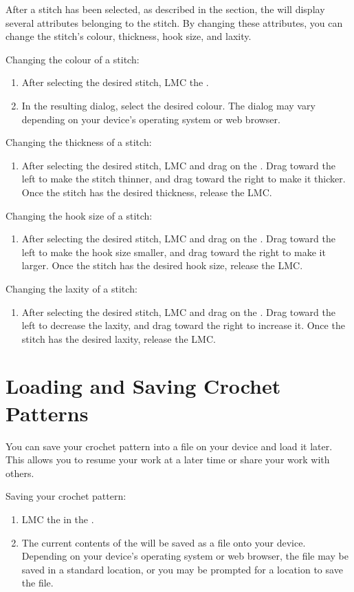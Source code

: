 \documentclass[main.tex]{subfiles}
\begin{document}
After a stitch has been selected, as described in the  section, the \PropSidebar{} will display several attributes belonging to the stitch. By changing these attributes, you can change the stitch's colour, thickness, hook size, and laxity.

Changing the colour of a stitch:
\begin{enumerate}
\item After selecting the desired stitch, LMC the \YCP.
\item In the resulting dialog, select the desired colour. The dialog may vary depending on your device's operating system or web browser.
\end{enumerate}

Changing the thickness of a stitch:
\begin{enumerate}
\item After selecting the desired stitch, LMC and drag on the \YTS. Drag toward the left to make the stitch thinner, and drag toward the right to make it thicker. Once the stitch has the desired thickness, release the LMC.
\end{enumerate}

Changing the hook size of a stitch:
\begin{enumerate}
\item After selecting the desired stitch, LMC and drag on the \HSS. Drag toward the left to make the hook size smaller, and drag toward the right to make it larger. Once the stitch has the desired hook size, release the LMC.
\end{enumerate}

Changing the laxity of a stitch:
\begin{enumerate}
\item After selecting the desired stitch, LMC and drag on the \SLS. Drag toward the left to decrease the laxity, and drag toward the right to increase it. Once the stitch has the desired laxity, release the LMC.
\end{enumerate}

\section{Loading and Saving Crochet Patterns}

You can save your crochet pattern into a file on your device and load it later. This allows you to resume your work at a later time or share your work with others.

Saving your crochet pattern:
\begin{enumerate}
\item LMC the \DB{} in the \MenuBar.
\item The current contents of the \PTI{} will be saved as a file onto your device. Depending on your device's operating system or web browser, the file may be saved in a standard location, or you may be prompted for a location to save the file.
\end{enumerate}
\end{document}
